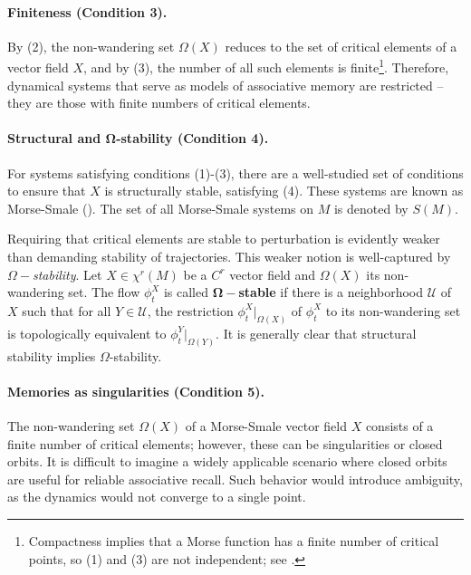 \documentclass[12pt]{article}
\begin{document}
\paragraph{Finiteness (Condition 3).}
By (2), the non-wandering set $\Omega(X)$ reduces to the set of critical elements of a vector field $X$, and by (3), the number of all such elements is finite\footnote{Compactness implies that a Morse function has a finite number of critical points, so (1) and (3) are not independent; see .}. Therefore, dynamical systems that serve as models of associative memory are restricted -- they are those with finite numbers of critical elements.

\paragraph{Structural and $\bm{\Omega}$-stability (Condition 4).}
For systems satisfying conditions (1)-(3), there are a well-studied set of conditions to ensure that $X$ is structurally stable, satisfying (4). These systems are known as Morse-Smale (\cite{smale1960morse}). The set of all Morse-Smale systems on $M$ is denoted by $S(M)$. 

Requiring that critical elements are stable to perturbation is evidently weaker than demanding stability of trajectories. This weaker notion is well-captured by \textit{${\Omega}-$stability}. Let $X \in \chi^r(M)$ be a $C^r$ vector field and $\Omega(X)$ its non-wandering set. The flow $\phi_t^X$ is called $\mathbf{\Omega}-$\textbf{stable} if there is a neighborhood $\mathcal{U}$ of $X$ such that for all $Y \in \mathcal{U}$, the restriction $\phi_t^X|_{\Omega(X)}$ of $\phi_t^X$ to its non-wandering set is topologically equivalent to $\phi_t^Y|_{\Omega(Y)}$. It is generally clear that structural stability implies $\Omega$-stability.


\paragraph{Memories as singularities (Condition 5).}
The non-wandering set $\Omega(X)$ of a Morse-Smale vector field $X$ consists of a finite number of critical elements; however, these can be singularities or closed orbits. It is difficult to imagine a widely applicable scenario where closed orbits are useful for reliable associative recall. Such behavior would introduce ambiguity, as the dynamics would not converge to a single point. 
\end{document}
